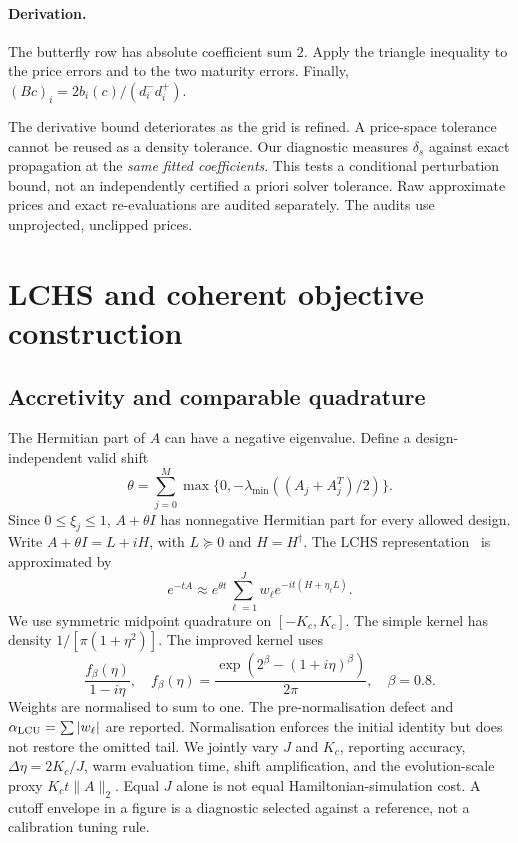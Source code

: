 \documentclass[10pt]{article}
\newcommand{\norm}[1]{\lVert #1\rVert}
\newcommand{\lchsnode}{\eta}
\newcommand{\lchsshift}{\theta}
\begin{document}
\paragraph{Derivation.}
The butterfly row has absolute coefficient sum $2$. Apply the triangle inequality to the price errors and to the two maturity errors. Finally, $(Bc)_i=2b_i(c)/(d_i^-d_i^+)$.


The derivative bound deteriorates as the grid is refined. A price-space tolerance cannot be reused as a density tolerance. Our diagnostic measures $\delta_s$ against exact propagation at the \emph{same fitted coefficients}. This tests a conditional perturbation bound, not an independently certified a priori solver tolerance. Raw approximate prices and exact re-evaluations are audited separately. The audits use unprojected, unclipped prices.

\section{LCHS and coherent objective construction}
\subsection{Accretivity and comparable quadrature}
The Hermitian part of $A$ can have a negative eigenvalue. Define a design-independent valid shift
\begin{equation}
 \lchsshift=\sum_{j=0}^{M}\max\{0,-\lambda_{\min}((A_j+A_j^T)/2)\}.
\end{equation}
Since $0\leq\xi_j\leq1$, $A+\lchsshift I$ has nonnegative Hermitian part for every allowed design. Write $A+\lchsshift I=L+iH$, with $L\succeq0$ and $H=H^\dagger$. The LCHS representation~\cite{lchs,nearoptimal} is approximated by
\begin{equation}
 e^{-tA}\approx e^{\lchsshift t}\sum_{\ell=1}^J w_\ell
 e^{-it(H+\lchsnode_\ell L)}. \label{eq:lchs}
\end{equation}
We use symmetric midpoint quadrature on $[-K_c,K_c]$. The simple kernel has density $1/[\pi(1+\lchsnode^2)]$. The improved kernel uses
\begin{equation}
 \frac{f_\beta(\lchsnode)}{1-i\lchsnode},\quad
 f_\beta(\lchsnode)=\frac{\exp(2^\beta-(1+i\lchsnode)^\beta)}{2\pi},\quad\beta=0.8.
\end{equation}
Weights are normalised to sum to one. The pre-normalisation defect and $\alpha_{\rm LCU}=\sum|w_\ell|$ are reported. Normalisation enforces the initial identity but does not restore the omitted tail. We jointly vary $J$ and $K_c$, reporting accuracy, $\Delta\lchsnode=2K_c/J$, warm evaluation time, shift amplification, and the evolution-scale proxy $K_c t\norm A_2$. Equal $J$ alone is not equal Hamiltonian-simulation cost. A cutoff envelope in a figure is a diagnostic selected against a reference, not a calibration tuning rule.
\end{document}
